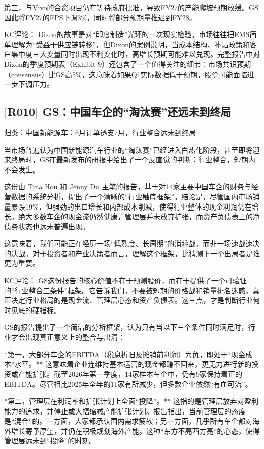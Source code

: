 \documentclass[11pt]{ctexart}
\begin{document}
第三，与Vivo的合资项目仍在等待政府批准，导致FY27的产能爬坡预期放缓。GS因此将FY27的EPS下调3\%，同时将部分预期量推迟到FY28。

KC评论： Dixon的故事是对“印度制造”光环的一次现实检验。市场往往把EMS简单理解为“受益于供应链转移”，但Dixon的案例说明，当成本结构、补贴政策和客户集中度三大变量同时出现不利变化时，高增长预期可能难以兑现。完整报告中对Dixon的季度预期表（Exhibit 9）还包含了一个值得关注的细节：市场共识预期（consensus）比GS高5\%，这意味着如果Q1实际数据低于预期，股价可能面临进一步下调压力。

\subsection{[R010] GS：中国车企的“淘汰赛”还远未到终局}
{\small\color{refgray}归类：中国新能源车：6月订单透支7月，行业整合远未到终局}

当市场普遍认为中国新能源汽车行业的“淘汰赛”已经进入白热化阶段，甚至即将迎来终局时，GS在最新发布的研报中给出了一个反直觉的判断：行业整合，短期内不会发生。

这份由 Tina Hou 和 Jenny Du 主笔的报告，基于对14家主要中国车企的财务与经营数据的系统分析，提出了一个清晰的“行业触底框架”。结论是，尽管国内市场销量暴跌19\%，但强劲的出口增长和内部成本削减，使得行业整体的现金利润仍在增长。绝大多数车企的现金流仍然健康，管理层并未放弃扩张，而资产负债表上的净债务状态也远未普遍出现。

这意味着，我们可能正在经历一场“低烈度、长周期”的消耗战，而非一场速战速决的决战。对于投资者和产业决策者而言，理解这个框架，比猜测下一个出局者是谁更为重要。

KC评论： GS这份报告的核心价值不在于预测股价，而在于提供了一个可验证的“行业整合三条件”框架。它告诉我们，不要被短期的价格战和销量排名迷惑，真正决定行业格局的是现金流、管理层心态和资产负债表。这三点，才是判断行业何时见底的硬指标。

GS的报告提出了一个简洁的分析框架，认为只有当以下三个条件同时满足时，行业才会出现真正意义上的整合与出清：

*第一，大部分车企的EBITDA（税息折旧及摊销前利润）为负，即处于“现金成本”水平。** 这意味着企业连维持基本运营的现金都赚不回来，更无力进行新的投资或产能扩张。截至2026年第一季度，14家样本车企中，仍有9家保持着正的EBITDA。尽管相比2025年全年的11家有所减少，但多数企业依然“有血可流”。

*第二，管理层在利润率和扩张计划上全面“投降”。** 这指的是管理层放弃对盈利能力的追求，并停止或大幅缩减产能扩张计划。报告指出，当前管理层的态度是“混合”的。一方面，大家都承认国内需求疲软；另一方面，几乎所有车企都对海外增长寄予厚望，并仍在积极规划海外产能。这种“东方不亮西方亮”的心态，使得管理层远未到“投降”的时刻。
\end{document}

